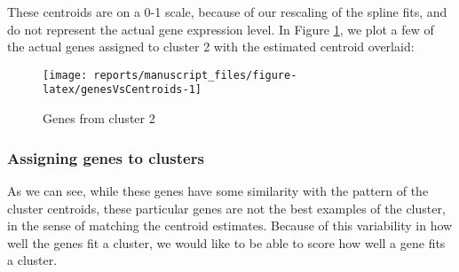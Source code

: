 \documentclass[9pt,a4paper,]{extarticle}
\newenvironment{Shaded}{\begin{snugshade}}{\end{snugshade}}
\newcommand{\DataTypeTok}[1]{\textcolor[rgb]{0.13,0.29,0.53}{#1}}
\newcommand{\DecValTok}[1]{\textcolor[rgb]{0.00,0.00,0.81}{#1}}
\newcommand{\FloatTok}[1]{\textcolor[rgb]{0.00,0.00,0.81}{#1}}
\newcommand{\KeywordTok}[1]{\textcolor[rgb]{0.13,0.29,0.53}{\textbf{#1}}}
\newcommand{\NormalTok}[1]{#1}
\newcommand{\OperatorTok}[1]{\textcolor[rgb]{0.81,0.36,0.00}{\textbf{#1}}}
\newcommand{\OtherTok}[1]{\textcolor[rgb]{0.56,0.35,0.01}{#1}}
\newcommand{\StringTok}[1]{\textcolor[rgb]{0.31,0.60,0.02}{#1}}
\begin{document}
These centroids are on a 0-1 scale, because of our rescaling of the spline
fits, and do not represent the actual gene expression level. In Figure \ref{fig:genesVsCentroids}, we plot a few
of the actual genes assigned to cluster 2 with the estimated centroid overlaid:

\begin{Shaded}
\end{Shaded}

\begin{figure}[H]

{\centering \texttt{[image: reports/manuscript\_files/figure-latex/genesVsCentroids-1]} 

}

\caption{Genes from cluster 2}\label{fig:genesVsCentroids}
\end{figure}

\hypertarget{assigning-genes-to-clusters}{%
\subsubsection{Assigning genes to clusters}\label{assigning-genes-to-clusters}}

As we can see, while these genes have some similarity with the pattern of the
cluster centroids, these particular genes are not the best examples of the
cluster, in the sense of matching the centroid estimates. Because of this
variability in how well the genes fit a cluster, we would like to be able to
score how well a gene fits a cluster.
\end{document}
